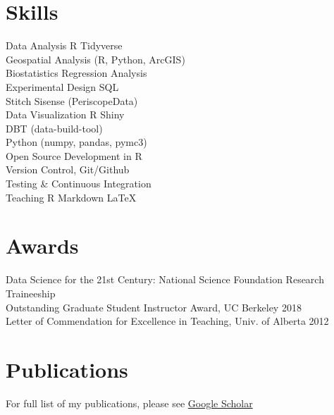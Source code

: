 \documentclass[]{deedy-resume-openfont}
\begin{document}
\begin{minipage}[t]{0.32\textwidth}

\section{Skills}
 \textbullet{} Data Analysis \textbullet{} R \textbullet{} Tidyverse
 \\\textbullet{} Geospatial Analysis (R, Python, ArcGIS) 
 \\\textbullet{} Biostatistics \textbullet{} Regression Analysis 
 \\\textbullet{} Experimental Design \textbullet{} SQL
 \\\textbullet{} Stitch \textbullet{} Sisense (PeriscopeData) 
 \\\textbullet{} Data Visualization  \textbullet{} R Shiny
 \\\textbullet{} DBT (data-build-tool)
 \\\textbullet{} Python (numpy, pandas, pymc3)
 \\\textbullet{} Open Source Development in R 
 \\\textbullet{} Version Control, Git/Github 
 \\\textbullet{} Testing \& Continuous Integration
 \\\textbullet{} Teaching \textbullet{} R Markdown \textbullet{} LaTeX 
\sectionsep


\section{Awards}

\textbullet{} Data Science for the 21st Century: National Science Foundation Research Traineeship \href{http://ds421.berkeley.edu}{\faGlobe} \\
\textbullet{} Outstanding Graduate Student Instructor Award, UC Berkeley 2018\\
\textbullet{} Letter of Commendation for Excellence in Teaching, Univ. of Alberta 2012\\
\sectionsep

\section{Publications}
For full list of my publications, please see \href{https://scholar.google.com/citations?user=0BKLXCUAAAAJ}{Google Scholar \faGraduationCap} 

%
%

\end{minipage} 
\end{document}
